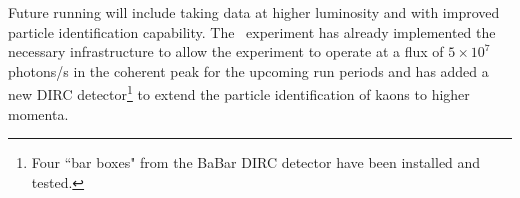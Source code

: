 Future running will include taking data at higher luminosity  and with improved particle identification capability. The \gx~experiment has already implemented the necessary infrastructure to allow the experiment to operate at a flux of $5\times10^{7}$ photons/s in the coherent peak for the upcoming run periods and has added a new DIRC detector\footnote{Four ``bar boxes" from the BaBar DIRC\cite{Aubert:2001tu} detector have been installed and tested.} to extend the particle identification of kaons to higher momenta. 

